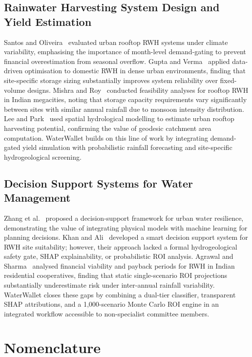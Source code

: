 ﻿\documentclass[conference]{IEEEtran}
\begin{document}
\subsection{Rainwater Harvesting System Design and Yield Estimation}

Santos and Oliveira~\cite{santos2020} evaluated urban rooftop RWH systems under climate variability, emphasising the importance of month-level demand-gating to prevent financial overestimation from seasonal overflow. Gupta and Verma~\cite{gupta2021} applied data-driven optimisation to domestic RWH in dense urban environments, finding that site-specific storage sizing substantially improves system reliability over fixed-volume designs. Mishra and Roy~\cite{mishra2022} conducted feasibility analyses for rooftop RWH in Indian megacities, noting that storage capacity requirements vary significantly between sites with similar annual rainfall due to monsoon intensity distribution. Lee and Park~\cite{lee2022} used spatial hydrological modelling to estimate urban rooftop harvesting potential, confirming the value of geodesic catchment area computation. WaterWallet builds on this line of work by integrating demand-gated yield simulation with probabilistic rainfall forecasting and site-specific hydrogeological screening.

\subsection{Decision Support Systems for Water Management}

Zhang et al.~\cite{zhang2021} proposed a decision-support framework for urban water resilience, demonstrating the value of integrating physical models with machine learning for planning decisions. Khan and Ali~\cite{khan2021} developed a smart decision support system for RWH site suitability; however, their approach lacked a formal hydrogeological safety gate, SHAP explainability, or probabilistic ROI analysis. Agrawal and Sharma~\cite{agrawal2021} analysed financial viability and payback periods for RWH in Indian residential cooperatives, finding that static single-scenario ROI projections substantially underestimate risk under inter-annual rainfall variability. WaterWallet closes these gaps by combining a dual-tier classifier, transparent SHAP attributions, and a 1,000-scenario Monte Carlo ROI engine in an integrated workflow accessible to non-specialist committee members.

\section{Nomenclature}
\label{sec:nomenclature}
\end{document}
